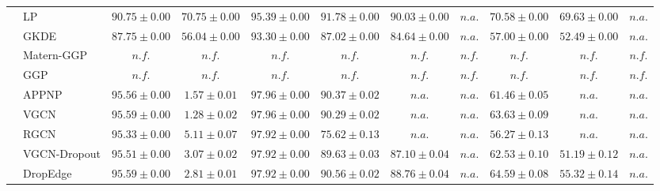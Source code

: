 \begin{table*}[!h]
{\begin{tabular}{ll|cc|cccc|ccc}
        \midrule

        & LP & ${90.75\scriptscriptstyle \pm 0.00}$ & ${70.75\scriptscriptstyle \pm 0.00}$ & ${95.39\scriptscriptstyle \pm 0.00}$ & ${{91.78}\scriptscriptstyle \pm 0.00}$ & ${90.03\scriptscriptstyle \pm 0.00}$ & $n.a.$ & ${{70.58}\scriptscriptstyle \pm 0.00}$ & ${69.63\scriptscriptstyle \pm 0.00}$ & $n.a.$\\
        & GKDE & ${87.75\scriptscriptstyle \pm 0.00}$ & ${56.04\scriptscriptstyle \pm 0.00}$ & ${93.30\scriptscriptstyle \pm 0.00}$ & ${87.02\scriptscriptstyle \pm 0.00}$ & ${84.64\scriptscriptstyle \pm 0.00}$ & $n.a.$ & ${57.00\scriptscriptstyle \pm 0.00}$ & ${52.49\scriptscriptstyle \pm 0.00}$ & $n.a.$\\
        & Matern-GGP & $n.f.$ & $n.f.$ & $n.f.$ & $n.f.$ & $n.f.$ & $n.f.$ & $n.f.$ & $n.f.$ & $n.f.$\\
        & GGP & $n.f.$ & $n.f.$ & $n.f.$ & $n.f.$ & $n.f.$ & $n.f.$ & $n.f.$ & $n.f.$ & $n.f.$\\
        & APPNP & ${95.56\scriptscriptstyle \pm 0.00}$ & ${1.57\scriptscriptstyle \pm 0.01}$ & ${\mathbf{97.96}\scriptscriptstyle \pm 0.00}$ & ${90.37\scriptscriptstyle \pm 0.02}$ & $n.a.$ & $n.a.$ & ${61.46\scriptscriptstyle \pm 0.05}$ & $n.a.$ & $n.a.$\\
        & VGCN & ${95.59\scriptscriptstyle \pm 0.00}$ & ${\mathbf{1.28}\scriptscriptstyle \pm 0.02}$ & ${\mathbf{97.96}\scriptscriptstyle \pm 0.00}$ & ${90.29\scriptscriptstyle \pm 0.02}$ & $n.a.$ & $n.a.$ & ${63.63\scriptscriptstyle \pm 0.09}$ & $n.a.$ & $n.a.$\\
        & RGCN & ${95.33\scriptscriptstyle \pm 0.00}$ & ${5.11\scriptscriptstyle \pm 0.07}$ & ${97.92\scriptscriptstyle \pm 0.00}$ & ${75.62\scriptscriptstyle \pm 0.13}$ & $n.a.$ & $n.a.$ & ${56.27\scriptscriptstyle \pm 0.13}$ & $n.a.$ & $n.a.$\\
        & VGCN-Dropout & ${95.51\scriptscriptstyle \pm 0.00}$ & ${3.07\scriptscriptstyle \pm 0.02}$ & ${97.92\scriptscriptstyle \pm 0.00}$ & ${89.63\scriptscriptstyle \pm 0.03}$ & ${87.10\scriptscriptstyle \pm 0.04}$ & $n.a.$ & ${62.53\scriptscriptstyle \pm 0.10}$ & ${51.19\scriptscriptstyle \pm 0.12}$ & $n.a.$\\
        & DropEdge & ${95.59\scriptscriptstyle \pm 0.00}$ & ${2.81\scriptscriptstyle \pm 0.01}$ & ${97.92\scriptscriptstyle \pm 0.00}$ & ${90.56\scriptscriptstyle \pm 0.02}$ & ${88.76\scriptscriptstyle \pm 0.04}$ & $n.a.$ & ${64.59\scriptscriptstyle \pm 0.08}$ & ${55.32\scriptscriptstyle \pm 0.14}$ & $n.a.$\\

\end{tabular}}
\end{table*}
